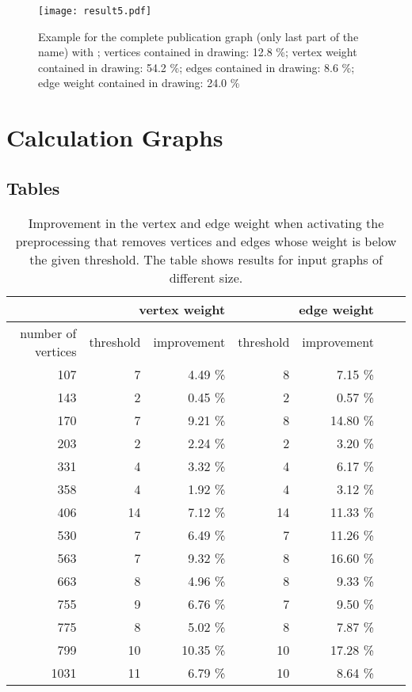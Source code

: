 \documentclass[]{llncs}
\begin{document}
\begin{sidewaysfigure}[htbp]
	\centering
	\texttt{[image: result5.pdf]}
		\caption{Example for the complete publication graph (only last
      part of the name) with ; vertices contained
      in drawing: 12.8 \%; vertex weight contained in drawing: 54.2
      \%; edges contained in drawing: 8.6 \%; edge weight contained in
      drawing: 24.0 \%}
	\label{fig:gen-result5}
\end{sidewaysfigure}
\newpage

\section{Calculation Graphs}
\label{app:calc}

\subsection{Tables}
\label{app:calc-tables}

\begin{table}
\centering
    \begin{tabular}{|r|r|r|r|r|r|r|}
		\hline
    ~ & \multicolumn{2}{r|}{vertex weight} &
		\multicolumn{2}{r|}{edge weight} \\
    \hline
		number of vertices & threshold & improvement & threshold &
		improvement \\
    \hline
		107 & 7 & 4.49 \% & 8 & 7.15 \% \\
    143 & 2 & 0.45 \% & 2 & 0.57 \% \\
    170 & 7 & 9.21 \% & 8 & 14.80 \% \\
		203 & 2 & 2.24 \% & 2 & 3.20 \% \\
		331 & 4 & 3.32 \% & 4 & 6.17 \% \\
		358 & 4 & 1.92 \% & 4 & 3.12 \% \\
		406 & 14 & 7.12 \% & 14 & 11.33 \% \\
		530 & 7 & 6.49 \% & 7 & 11.26 \% \\
    563 & 7 & 9.32 \% & 8 & 16.60 \% \\
    663 & 8 & 4.96 \% & 8 & 9.33 \% \\
		755 & 9 & 6.76 \% & 7 & 9.50 \% \\
		775 & 8 & 5.02 \% & 8 & 7.87 \% \\
		799 & 10 & 10.35 \% & 10 & 17.28 \% \\
		1031 & 11 & 6.79 \% & 10 & 8.64 \% \\
		\hline
    \end{tabular}

  \smallskip

\caption{Improvement in the vertex and edge weight when activating the
preprocessing that removes vertices and edges whose weight is below
the given threshold. The table shows results for input graphs of
different size.}
\label{tab:schrankenwerte}
\end{table}
\end{document}
